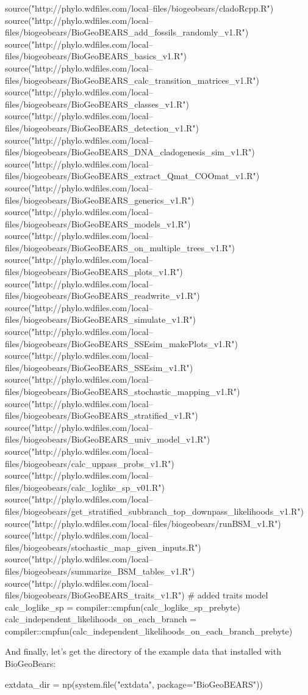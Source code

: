 \documentclass[11pt]{article}
\begin{document}
\begin{code}
source("http://phylo.wdfiles.com/local--files/biogeobears/cladoRcpp.R")
source("http://phylo.wdfiles.com/local--files/biogeobears/BioGeoBEARS_add_fossils_randomly_v1.R")
source("http://phylo.wdfiles.com/local--files/biogeobears/BioGeoBEARS_basics_v1.R")
source("http://phylo.wdfiles.com/local--files/biogeobears/BioGeoBEARS_calc_transition_matrices_v1.R")
source("http://phylo.wdfiles.com/local--files/biogeobears/BioGeoBEARS_classes_v1.R")
source("http://phylo.wdfiles.com/local--files/biogeobears/BioGeoBEARS_detection_v1.R")
source("http://phylo.wdfiles.com/local--files/biogeobears/BioGeoBEARS_DNA_cladogenesis_sim_v1.R")
source("http://phylo.wdfiles.com/local--files/biogeobears/BioGeoBEARS_extract_Qmat_COOmat_v1.R")
source("http://phylo.wdfiles.com/local--files/biogeobears/BioGeoBEARS_generics_v1.R")
source("http://phylo.wdfiles.com/local--files/biogeobears/BioGeoBEARS_models_v1.R")
source("http://phylo.wdfiles.com/local--files/biogeobears/BioGeoBEARS_on_multiple_trees_v1.R")
source("http://phylo.wdfiles.com/local--files/biogeobears/BioGeoBEARS_plots_v1.R")
source("http://phylo.wdfiles.com/local--files/biogeobears/BioGeoBEARS_readwrite_v1.R")
source("http://phylo.wdfiles.com/local--files/biogeobears/BioGeoBEARS_simulate_v1.R")
source("http://phylo.wdfiles.com/local--files/biogeobears/BioGeoBEARS_SSEsim_makePlots_v1.R")
source("http://phylo.wdfiles.com/local--files/biogeobears/BioGeoBEARS_SSEsim_v1.R")
source("http://phylo.wdfiles.com/local--files/biogeobears/BioGeoBEARS_stochastic_mapping_v1.R")
source("http://phylo.wdfiles.com/local--files/biogeobears/BioGeoBEARS_stratified_v1.R")
source("http://phylo.wdfiles.com/local--files/biogeobears/BioGeoBEARS_univ_model_v1.R")
source("http://phylo.wdfiles.com/local--files/biogeobears/calc_uppass_probs_v1.R")
source("http://phylo.wdfiles.com/local--files/biogeobears/calc_loglike_sp_v01.R")
source("http://phylo.wdfiles.com/local--files/biogeobears/get_stratified_subbranch_top_downpass_likelihoods_v1.R")
source("http://phylo.wdfiles.com/local--files/biogeobears/runBSM_v1.R")
source("http://phylo.wdfiles.com/local--files/biogeobears/stochastic_map_given_inputs.R")
source("http://phylo.wdfiles.com/local--files/biogeobears/summarize_BSM_tables_v1.R")
source("http://phylo.wdfiles.com/local--files/biogeobears/BioGeoBEARS_traits_v1.R") # added traits model
calc_loglike_sp = compiler::cmpfun(calc_loglike_sp_prebyte)
calc_independent_likelihoods_on_each_branch = compiler::cmpfun(calc_independent_likelihoods_on_each_branch_prebyte)
\end{code}
And finally, let's get the directory of the example data
that installed with BioGeoBears:
\begin{code}
extdata_dir = np(system.file("extdata", package="BioGeoBEARS"))
\end{code}
\end{document}
